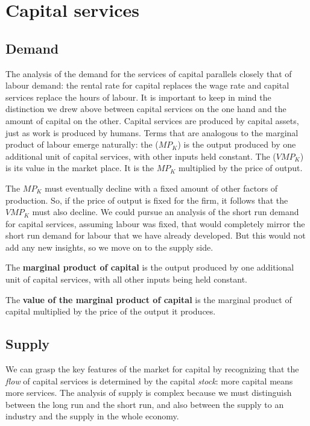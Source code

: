 \section{Capital services}\label{sec:ch12sec6}

\subsection*{Demand}

The analysis of the demand for the services of capital parallels closely that of labour demand: the rental rate for capital replaces the wage rate and capital services replace the hours of labour. It is important to keep in mind the distinction we drew above between capital services on the one hand and the amount of capital on the other. Capital services are produced by capital assets, just as work is produced by humans. Terms that are analogous to the marginal product of labour emerge naturally: the  ($MP_K$) is the output produced by one additional unit of capital services, with other inputs held constant. The  ($VMP_K$) is its value in the market place. It is the $MP_K$ multiplied by the price of output.

The $MP_K$ must eventually decline with a fixed amount of other factors of production. So, if the price of output is fixed for the firm, it follows that the $VMP_K$ must also decline. We could pursue an analysis of the short run demand for capital services, assuming labour was fixed, that would completely mirror the short run demand for labour that we have already developed.  But this would not add any new insights, so we move on to the supply side.

\begin{DefBox}
The \textbf{marginal product of capital} is the output produced by one additional unit of capital services, with all other inputs being held constant.

The \textbf{value of the marginal product of capital} is the marginal product of capital multiplied by the price of the output it produces.
\end{DefBox}

\subsection*{Supply}

We can grasp the key features of the market for capital by recognizing that the \textit{flow} of capital services is determined by the capital \textit{stock}: more capital means more services. The analysis of supply is complex because we must distinguish between the long run and the short run, and also between the supply to an industry and the supply in the whole economy.

